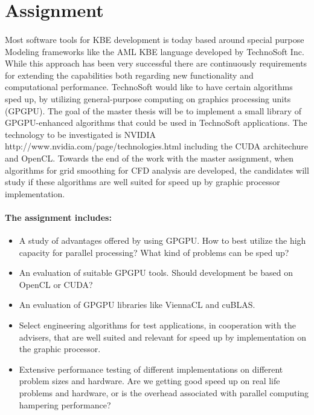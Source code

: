 
\section*{Assignment}

\paragraph{} %
Most software tools for KBE development is today based around special purpose Modeling frameworks like the AML KBE language developed by TechnoSoft Inc. While this approach has been very successful there are continuously requirements for extending the capabilities both regarding new functionality and computational performance. TechnoSoft would like to have certain algorithms sped up, by utilizing general-purpose computing on graphics processing units (GPGPU). The goal of the master thesis will be to implement a small library of GPGPU-enhanced algorithms that could be used in TechnoSoft applications. The technology to be investigated is NVIDIA http://www.nvidia.com/page/technologies.html including the CUDA architechure and OpenCL. Towards the end of the work with the master assignment, when algorithms for grid smoothing for CFD analysis are developed, the candidates will study if these algorithms are well suited for speed up by graphic processor implementation.

\paragraph{The assignment includes:} %
\label{par:the_assignment_includes_}

\begin{itemize}
\item A study of advantages offered by using GPGPU. How to best utilize the high capacity for parallel processing? What kind of problems can be sped up?
\item An evaluation of suitable GPGPU tools. Should development be based on OpenCL or CUDA?
\item An evaluation of GPGPU libraries like ViennaCL and cuBLAS.
\item Select engineering algorithms for test applications, in cooperation with the advisers, that are well suited and relevant for speed up by implementation on the graphic processor.
\item Extensive performance testing of different implementations on different problem sizes and hardware. Are we getting good speed up on real life problems and hardware, or is the overhead associated with parallel computing hampering performance?
\end{itemize}

